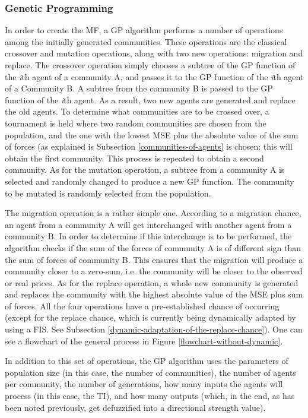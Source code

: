 \documentclass[12pt,journal,compsoc]{IEEEtran}
\begin{document}
\subsubsection{Genetic Programming}

In order to create the MF, a GP algorithm performs a number of operations among the initially generated communities. These operations are the classical crossover and mutation operations, along with two new operations: migration and replace. The crossover operation simply chooses a subtree of the GP function of the \textit{i}th agent of a community A, and passes it to the GP function of the \textit{i}th agent of a Community B. A subtree from the community B is passed to the GP function of the \textit{i}th agent. As a result, two new agents are generated and replace the old agents. To determine what communities are to be crossed over, a tournament is held where two random communities are chosen from the population, and the one with the lowest MSE plus the absolute value of the sum of forces (as explained is Subsection \ref{communities-of-agents} is chosen; this will obtain the first community. This process is repeated to obtain a second community. As for the mutation operation, a subtree from a community A is selected and randomly changed to produce a new GP function. The community to be mutated is randomly selected from the population.

The migration operation is a rather simple one. According to a migration chance, an agent from a community A will get interchanged with another agent from a community B. In order to determine if this interchange is to be performed, the algorithm checks if the sum of the forces of community A is of different sign than the sum of forces of community B. This ensures that the migration will produce a community closer to a zero-sum, i.e. the community will be closer to the observed or real prices. As for the replace operation, a whole new community is generated and replaces the community with the highest absolute value of the MSE plus sum of forces. All the four operations have a pre-established chance of occurring (except for the replace chance, which is currently being dynamically adapted by using a FIS. See Subsection \ref{dynamic-adaptation-of-the-replace-chance}). One can see a flowchart of the general process in Figure \ref{flowchart-without-dynamic}.

In addition to this set of operations, the GP algorithm uses the parameters of population size (in this case, the number of communities), the number of agents per community, the number of generations, how many inputs the agents will process (in this case, the TI), and how many outputs (which, in the end, as has been noted previously, get defuzzified into a directional strength value).
\end{document}
